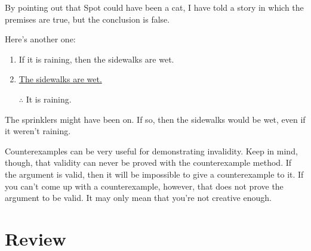 By pointing out that Spot could have been a cat, I have told a story in
which the premises are true, but the conclusion is false.

Here's another one:

\begin{enumerate}
\item If it is raining, then the sidewalks are wet.
\item \underline{The sidewalks are wet.}
\item [$\therefore$] It is raining.
\end{enumerate}

The sprinklers might have been on. If so, then the sidewalks would be wet, even if it weren't raining.

Counterexamples can be very useful for demonstrating invalidity. Keep in mind, though, that validity can never be proved with the counterexample method. If the argument is valid, then it will be impossible to give a counterexample to it. If you can't come up with a counterexample, however, that does not prove the argument to be valid. It may only mean that you're not creative enough.

\section{Review}
\label{sec:arg-review}



